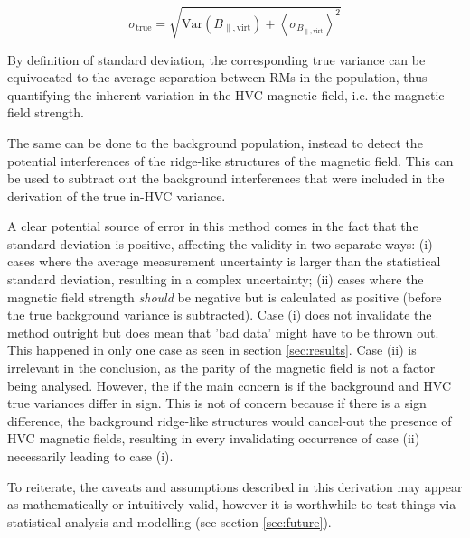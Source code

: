 \begin{equation}
    \sigma_{\mathrm{true}} = \sqrt{\mathrm{Var}\left(B_{\parallel, \mathrm{virt}}\right) + {\left<\sigma_{B_{\parallel, \mathrm{virt}}}\right>}^2}
\label{eq:var_sub_2}
\end{equation}


By definition of standard deviation, the corresponding true variance can be equivocated to the average separation between RMs in the population, thus quantifying the inherent variation in the HVC magnetic field, i.e. the magnetic field strength.


The same can be done to the background population, instead to detect the potential interferences of the ridge-like structures of the magnetic field. This can be used to subtract out the background interferences that were included in the derivation of the true in-HVC variance.


A clear potential source of error in this method comes in the fact that the standard deviation is positive, affecting the validity in two separate ways: (i) cases where the average measurement uncertainty is larger than the statistical standard deviation, resulting in a complex uncertainty; (ii) cases where the magnetic field strength \textit{should} be negative but is calculated as positive (before the true background variance is subtracted). Case (i) does not invalidate the method outright but does mean that 'bad data' might have to be thrown out. This happened in only one case as seen in section \ref{sec:results}. Case (ii) is irrelevant in the conclusion, as the parity of the magnetic field is not a factor being analysed. However, the if the main concern is if the background and HVC true variances differ in sign. This is not of concern because if there is a sign difference, the background ridge-like structures would cancel-out the presence of HVC magnetic fields, resulting in every invalidating occurrence of case (ii) necessarily leading to case (i).


To reiterate, the caveats and assumptions described in this derivation may appear as mathematically or intuitively valid, however it is worthwhile to test things via statistical analysis and modelling (see section \ref{sec:future}).

